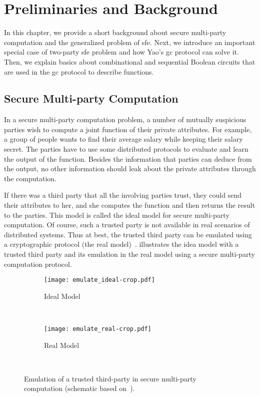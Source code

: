 \chapter{Preliminaries and Background}\label{chap:prelim}
In this chapter, we provide a short background about secure multi-party computation and the generalized problem of \acrfull{sfe}.
Next, we introduce an important special case of two-party \acrshort{sfe} problem and how Yao's \acrfull{gc} protocol can solve it.
Then, we explain basics about combinational and sequential Boolean circuits that are used in the \acrshort{gc} protocol to describe functions.

\section{Secure Multi-party Computation}\label{sec:prelim-smc}
In a secure multi-party computation problem, a number of mutually suspicious parties wish to compute a joint function of their private attributes.
For example, a group of people wants to find their average salary while keeping their salary secret.
The parties have to use some distributed protocols to evaluate and learn the output of the function.
Besides the information that parties can deduce from the output, no other information should leak about the private attributes through the computation.

If there was a third party that all the involving parties trust, they could send their attributes to her, and she computes the function and then returns the result to the parties.
This model is called the ideal model for secure multi-party computation.
Of course, such a trusted party is not available in real scenarios of distributed systems.
Thus at best, the trusted third party can be emulated using a cryptographic protocol (the real model)~\cite{goldreich2013general}.
 illustrates the idea model with a trusted third party and its emulation in the real model using a secure multi-party computation protocol.

\begin{figure}
    \centering
    \begin{subfigure}[tl]{0.3\textwidth}
        \texttt{[image: emulate\_ideal-crop.pdf]}
        \caption{Ideal Model}\label{fig:ideal-model}
    \end{subfigure}
		~~~~
    \begin{subfigure}[tr]{0.3\textwidth}
        \texttt{[image: emulate\_real-crop.pdf]}
        \caption{Real Model}\label{fig:real-model}
    \end{subfigure}\\
    \caption{Emulation of a trusted third-party in secure multi-party computation (schematic based on~\cite{goldreich2013general}).}\label{fig:multi-party-model}
\end{figure}

